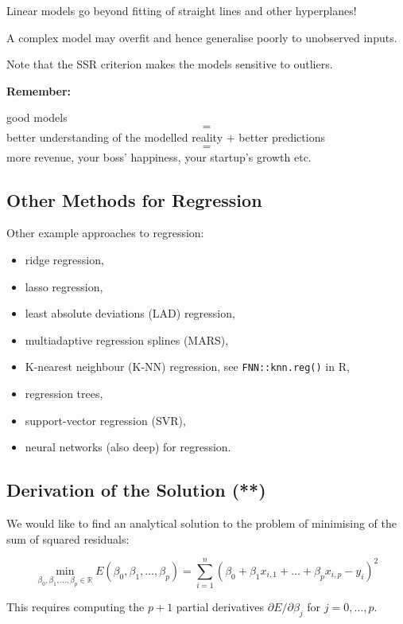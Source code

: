 \documentclass[10pt,b5paper,krantz1]{krantz}
\providecommand{\tightlist}{%
  \setlength{\itemsep}{0pt}\setlength{\parskip}{0pt}}
\begin{document}
Linear models go beyond fitting of straight lines and other hyperplanes!

A complex model may overfit and hence generalise poorly to unobserved inputs.

Note that the SSR criterion makes the models sensitive to outliers.

\textbf{Remember:}

good models
\[=\]
better understanding of the modelled reality \(+\) better predictions
\[=\]
more revenue, your boss' happiness, your startup's growth etc.

\hypertarget{other-methods-for-regression}{%
\subsection{Other Methods for Regression}\label{other-methods-for-regression}}

Other example approaches to regression:

\begin{itemize}
\tightlist
\item
  ridge regression,
\item
  lasso regression,
\item
  least absolute deviations (LAD) regression,
\item
  multiadaptive regression splines (MARS),
\item
  K-nearest neighbour (K-NN) regression, see \texttt{FNN::knn.reg()} in R,
\item
  regression trees,
\item
  support-vector regression (SVR),
\item
  neural networks (also deep) for regression.
\end{itemize}

\hypertarget{derivation-of-the-solution-1}{%
\subsection{Derivation of the Solution (**)}\label{derivation-of-the-solution-1}}

We would like to find an analytical solution
to the problem of minimising of the sum of squared residuals:

\[
\min_{\beta_0, \beta_1,\dots, \beta_p\in\mathbb{R}} E(\beta_0, \beta_1, \dots, \beta_p)=
\sum_{i=1}^n \left( \beta_0 + \beta_1 x_{i,1}+\dots+\beta_p x_{i,p} - y_{i} \right)^2
\]

This requires computing the \(p+1\) partial derivatives
\({\partial E}/{\partial \beta_j}\) for \(j=0,\dots,p\).
\end{document}
